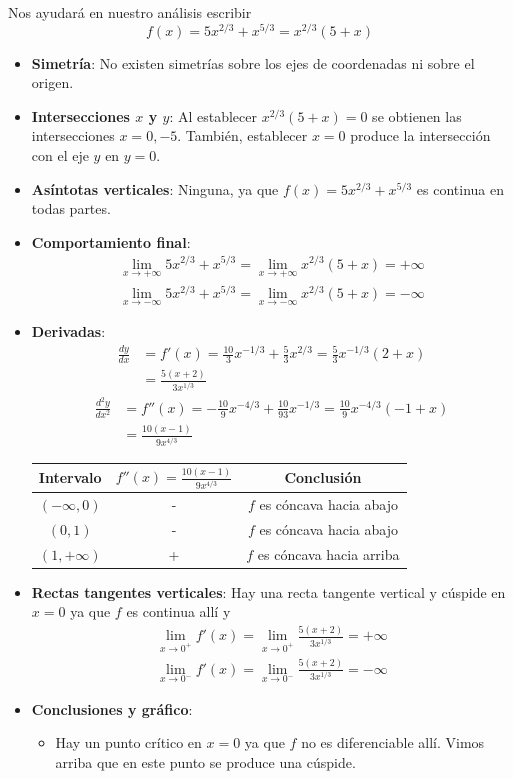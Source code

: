 \documentclass[12pt]{article}
\begin{document}
Nos ayudará en nuestro análisis escribir
\[f(x)=5x^{2/3}+x^{5/3}=x^{2/3}(5+x)\]
\begin{itemize}
\item \textbf{Simetría}: No existen simetrías sobre los ejes de coordenadas ni sobre el origen.
\item \textbf{Intersecciones $x$ y $y$}: Al establecer $x^{2/3}(5+x)=0$ se obtienen las intersecciones $x=0,-5$. También, establecer $x=0$ produce la intersección con el eje $y$ en $y=0$.
\item  \textbf{Asíntotas verticales}: Ninguna, ya que $f(x) = 5x^{2/3}+x^{5/3}$ es continua en todas partes.
\item  \textbf{Comportamiento final}: 
  \begin{align*}
    \lim_{x \to +\infty}5x^{2/3}+x^{5/3} = \lim_{x \to +\infty} x^{2/3}(5+x) = +\infty \\
    \lim_{x \to -\infty} 5x^{2/3}+x^{5/3} = \lim_{x \to -\infty}  x^{2/3}(5+x) = -\infty 
  \end{align*}
\item \textbf{Derivadas}:
  \begin{align*}
    \frac{dy}{dx}
    &= f'(x) = \frac{10}{3}x^{-1/3} + \frac{5}{3}x^{2/3} = \frac{5}{3}x^{-1/3}(2+x)\\
    &= \frac{5(x+2)}{3x^{1/3}} 
  \end{align*}
  \begin{align*}
    \frac{d^2y}{dx^2}
    &= f''(x) = -\frac{10}{9}x^{-4/3} + \frac{10}{93}x^{-1/3} = \frac{10}{9}x^{-4/3}(-1+x) \\
    &= \frac{10(x-1)}{9x^{4/3}}
  \end{align*}
    \begin{table}[H]
    \centering
    \begin{tabular}{c|c|c}
      \hline
      Intervalo & $f''(x) = \frac{10(x-1)}{9x^{4/3}}$ & Conclusión \\
      \hline
      $(-\infty,0)$ & - & $f$ es cóncava hacia abajo \\
      $(0,1)$ & - & $f$ es cóncava hacia abajo \\
      $(1,+\infty)$ & + & $f$ es cóncava hacia arriba \\
      \hline
    \end{tabular}
  \end{table}
\item \textbf{Rectas tangentes verticales}: Hay una recta tangente vertical y cúspide en $x = 0$ ya que $f$ es continua allí y
  \begin{align*}
    \lim_{x \to 0^+} f'(x) = \lim_{x \to 0^+} \frac{5(x+2)}{3x^{1/3}}  = +\infty \\
    \lim_{x \to 0^-} f'(x) = \lim_{x \to 0^-} \frac{5(x+2)}{3x^{1/3}}  = -\infty 
  \end{align*}
\item \textbf{Conclusiones y gráfico}:
  \begin{itemize}
    \item Hay un punto crítico en $x = 0$ ya que $f$ no es diferenciable allí. Vimos arriba que en este punto se produce una cúspide.
  \end{itemize}
\end{itemize}
\end{document}
